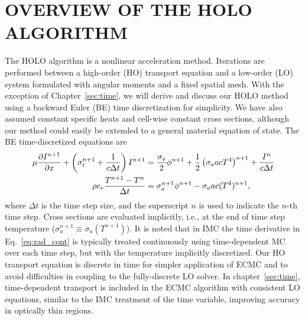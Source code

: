 
\chapter{\uppercase {Overview of the HOLO Algorithm}}
\label{chp:holo}

The HOLO algorithm is a nonlinear acceleration method.  Iterations are performed between a
high-order (HO) transport equation and a low-order (LO) system formulated with angular moments
and a fixed spatial mesh. 
With the exception of Chapter~\ref{sec:time}, we will derive and discuss our HOLO
method using a backward Euler (BE) time discretization for simplicity.  We have also assumed constant specific heats
and cell-wise constant cross sections, although our method could easily be extended
to a general material equation of state. The BE time-discretized
equations are
\begin{align}
    \mu \frac{\partial I^{n+1}}{\partial x} + \left(\sigma_t^{n+1} + \frac{1}{c \Delta t }\right) I^{n+1}
&= \frac{\sigma_s}{2} \phi^{n+1} +\frac{1}{2} \left(\sigma_a a c T^4 \right)^{n+1} + \frac{I^n}{c \Delta t} \label{eq:trans_td} \\
\rho c_v \frac{T^{n+1} - T^n}{\Delta t} &= \sigma_a^{n+1} \phi^{n+1}
- \sigma_a a c (T^4)^{n+1} \label{eq:mat_td},
\end{align}
where $\Delta t$ is the time step size, and the superscript $n$ is used to indicate
the $n$-th time step. Cross sections are evaluated implicitly, i.e., at the end of time step
temperature ($\sigma_a^{n+1}\equiv\sigma_a(T^{n+1})$). It is noted that in IMC the time derivative in
Eq.~\eqref{eq:rad_cont} is typically treated continuously using time-dependent MC over each
time step, but with the temperature implicitly discretized.  Our HO transport equation is
discrete in time for simpler application of ECMC and to avoid difficulties in coupling to the
fully-discrete LO solver.  In chapter~\ref{sec:time}, time-dependent transport is
included in the ECMC algorithm with consistent LO equations, similar to the IMC
treatment of the time variable, improving accuracy in optically thin
regions.

